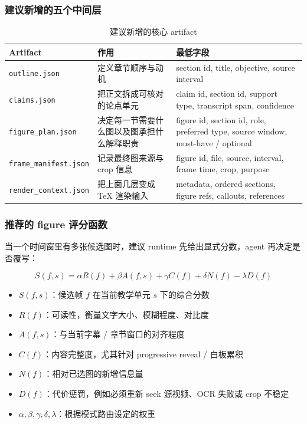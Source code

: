 \documentclass[a4paper]{article}
\begin{document}
\subsubsection{建议新增的五个中间层}

\begin{table}[H]
\centering
\caption{建议新增的核心 artifact}
{\small
\begin{tabularx}{\textwidth}{p{3.4cm}p{2.6cm}Y}
\toprule
Artifact & 作用 & 最低字段 \\
\midrule
\texttt{outline.json} & 定义章节顺序与动机 & section id, title, objective, source interval \\
\texttt{claims.json} & 把正文拆成可核对的论点单元 & claim id, section id, support type, transcript span, confidence \\
\texttt{figure\_plan.json} & 决定每一节需要什么图以及图承担什么解释职责 & figure id, section id, role, preferred type, source window, must-have / optional \\
\texttt{frame\_manifest.json} & 记录最终图来源与 crop 信息 & figure id, file, source, interval, frame time, crop, purpose \\
\texttt{render\_context.json} & 把上面几层变成 TeX 渲染输入 & metadata, ordered sections, figure refs, callouts, references \\
\bottomrule
\end{tabularx}
}
\end{table}

\subsubsection{推荐的 figure 评分函数}

当一个时间窗里有多张候选图时，建议 runtime 先给出显式分数，agent 再决定是否覆写：

$$
S(f, s) = \alpha R(f) + \beta A(f, s) + \gamma C(f) + \delta N(f) - \lambda D(f)
$$

\begin{itemize}
\item $S(f, s)$：候选帧 $f$ 在当前教学单元 $s$ 下的综合分数
\item $R(f)$：可读性，衡量文字大小、模糊程度、对比度
\item $A(f, s)$：与当前字幕 / 章节窗口的对齐程度
\item $C(f)$：内容完整度，尤其针对 progressive reveal / 白板累积
\item $N(f)$：相对已选图的新增信息量
\item $D(f)$：代价惩罚，例如必须重新 seek 源视频、OCR 失败或 crop 不稳定
\item $\alpha, \beta, \gamma, \delta, \lambda$：根据模式路由设定的权重
\end{itemize}
\end{document}
